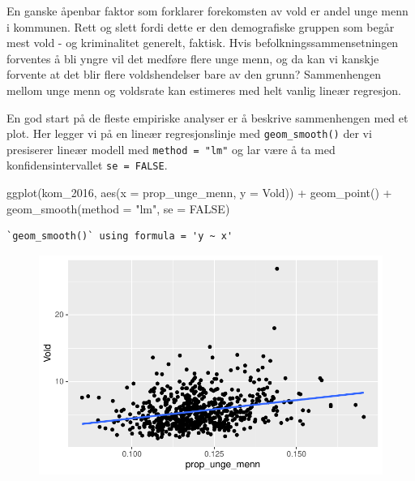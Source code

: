 \documentclass[
  letterpaper,
  DIV=11,
  numbers=noendperiod]{scrreprt}
\newenvironment{Shaded}{\begin{snugshade}}{\end{snugshade}}
\newcommand{\AttributeTok}[1]{\textcolor[rgb]{0.40,0.45,0.13}{#1}}
\newcommand{\ConstantTok}[1]{\textcolor[rgb]{0.56,0.35,0.01}{#1}}
\newcommand{\FunctionTok}[1]{\textcolor[rgb]{0.28,0.35,0.67}{#1}}
\newcommand{\NormalTok}[1]{\textcolor[rgb]{0.00,0.23,0.31}{#1}}
\newcommand{\SpecialCharTok}[1]{\textcolor[rgb]{0.37,0.37,0.37}{#1}}
\newcommand{\StringTok}[1]{\textcolor[rgb]{0.13,0.47,0.30}{#1}}
\theoremstyle{definition}
\theoremstyle{remark}
\begin{document}
En ganske åpenbar faktor som forklarer forekomsten av vold er andel unge
menn i kommunen. Rett og slett fordi dette er den demografiske gruppen
som begår mest vold - og kriminalitet generelt, faktisk. Hvis
befolkningssammensetningen forventes å bli yngre vil det medføre flere
unge menn, og da kan vi kanskje forvente at det blir flere
voldshendelser bare av den grunn? Sammenhengen mellom unge menn og
voldsrate kan estimeres med helt vanlig lineær regresjon.

En god start på de fleste empiriske analyser er å beskrive sammenhengen
med et plot. Her legger vi på en lineær regresjonslinje med
\texttt{geom\_smooth()} der vi presiserer lineær modell med
\texttt{method\ =\ "lm"} og lar være å ta med konfidensintervallet
\texttt{se\ =\ FALSE}.

\begin{Shaded}
\begin{Highlighting}[]
\FunctionTok{ggplot}\NormalTok{(kom\_2016, }\FunctionTok{aes}\NormalTok{(}\AttributeTok{x =}\NormalTok{ prop\_unge\_menn, }
                     \AttributeTok{y =}\NormalTok{ Vold)) }\SpecialCharTok{+}
  \FunctionTok{geom\_point}\NormalTok{() }\SpecialCharTok{+}
  \FunctionTok{geom\_smooth}\NormalTok{(}\AttributeTok{method =} \StringTok{"lm"}\NormalTok{, }\AttributeTok{se =} \ConstantTok{FALSE}\NormalTok{) }
\end{Highlighting}
\end{Shaded}

\begin{verbatim}
`geom_smooth()` using formula = 'y ~ x'
\end{verbatim}

\begin{figure}[H]

{\centering \includegraphics{./linear_regresjon_files/figure-pdf/unnamed-chunk-3-1.pdf}

}

\end{figure}
\end{document}
